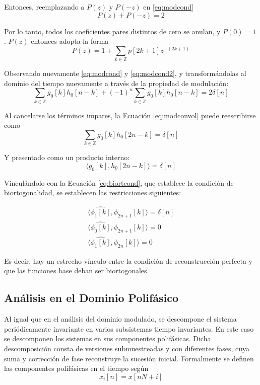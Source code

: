 	Entonces, reemplazando a $P(z)$ y $P(-z)$ en  \eqref{eq:modcond}
		\begin{equation}
			P(z)+P(-z)=2
		\end{equation}
	
	Por lo tanto, todos los coeficientes pares distintos de cero se anulan, y $P(0)=1$. $P(z)$ entonces adopta la forma
		\begin{equation}
			P(z)=1+\sum_{k\in\mathbb{Z}} p[2k+1]z^{-(2k+1)}
		\end{equation}
	
	Observando nuevamente \eqref{eq:modcond} y \eqref{eq:modcond2}, y transformándolas al dominio del tiempo nuevamente a través de la propiedad de modulación: 
		\begin{equation}
			\sum_{k\in\mathbb{Z}}g_0[k]h_0[n-k]+(-1)^n\sum_{k\in\mathbb{Z}}g_0[k]h_0[n-k]=2\delta[n]
			\label{eq:modconvol}
		\end{equation}

	Al cancelarse los términos impares, la Ecuación \eqref{eq:modconvol} puede reescribirse como
		\begin{equation}
			\sum_{k\in\mathbb{Z}}g_0[k]h_0[2n-k]=\delta[n]
		\end{equation}

	Y presentado como un producto interno:
		\begin{equation}
			\langle g_0[k],h_0[2n-k] \rangle=\delta[n]
		\end{equation}

	Vinculándolo con la Ecuación \eqref{eq:biortcond}, que establece la condición de biortogonalidad, se establecen las restricciones siguientes:

	\begin{align}
		\langle \hat{\phi_1[k]},\phi_{2n+1}[k] \rangle = \delta[n]	\\
		\langle \hat{\phi_0[k]},\phi_{2n+1}[k]\rangle	= 0	\\
		\langle \hat{\phi_1[k]},\phi_{2n}[k]\rangle = 0
	\end{align}

	Es decir, hay un estrecho vínculo entre la condición de reconstrucción perfecta y que las funciones base deban ser biortogonales.

\subsection{Análisis en el Dominio Polifásico}

	Al igual que en el análisis del dominio modulado, se descompone el sistema periódicamente 
	invariante en varios subsistemas tiempo invariantes. En este caso se descomponen los sistemas en sus componentes polifásicas. 
	Dicha descomposición consta de versiones submuestreadas y con diferentes fases, cuya suma y corrección de fase reconstruye la sucesión inicial.
	Formalmente se definen las componentes polifásicas en el tiempo según
		\begin{equation}
			x_i[n] = x[nN+i]
			\label{eq:poly_comp}
		\end{equation}
		
